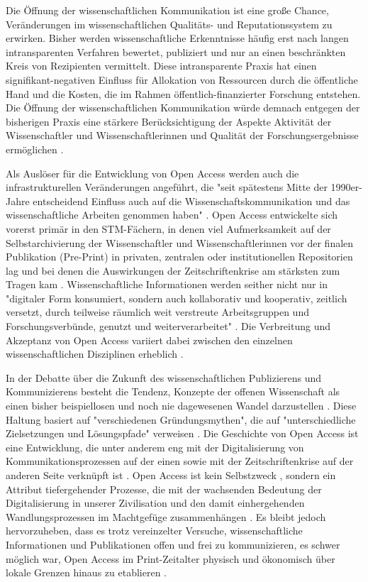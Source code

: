 Die Öffnung der wissenschaftlichen Kommunikation ist eine große Chance, Veränderungen im wissenschaftlichen Qualitäts- und Reputationssystem zu erwirken. Bisher werden wissenschaftliche Erkenntnisse häufig erst nach langen intransparenten Verfahren bewertet, publiziert und nur an einen beschränkten Kreis von Rezipienten vermittelt. Diese intransparente Praxis hat einen signifikant-negativen Einfluss für Allokation von Ressourcen durch die öffentliche Hand und die Kosten, die im Rahmen öffentlich-finanzierter Forschung entstehen. Die Öffnung der wissenschaftlichen Kommunikation würde demnach entgegen der bisherigen Praxis eine stärkere Berücksichtigung der Aspekte Aktivität der Wissenschaftler und Wissenschaftlerinnen und Qualität der Forschungsergebnisse ermöglichen \cite{heise_2012}.

Als Auslöser für die Entwicklung von Open Access werden auch die infrastrukturellen Veränderungen angeführt, die "seit spätestens Mitte der 1990er-Jahre entscheidend Einfluss auch auf die Wissenschaftskommunikation und das wissenschaftliche Arbeiten genommen haben" \cite{schulze_2013_open}. Open Access entwickelte sich vorerst primär in den STM-Fächern, in denen viel Aufmerksamkeit auf der Selbstarchivierung der Wissenschaftler und Wissenschaftlerinnen vor der finalen Publikation (Pre-Print) in privaten, zentralen oder institutionellen Repositorien lag \cite{adema_2013_political} und bei denen die Auswirkungen der Zeitschriftenkrise am stärksten zum Tragen kam \cite{naeder_2010_open}. Wissenschaftliche Informationen werden seither nicht nur in "digitaler Form konsumiert, sondern auch kollaborativ und kooperativ, zeitlich versetzt, durch teilweise räumlich weit verstreute Arbeitsgruppen und Forschungsverbünde, genutzt und weiterverarbeitet" \cite{schulze_2013_open}. Die Verbreitung und Akzeptanz von Open Access variiert dabei zwischen den einzelnen wissenschaftlichen Disziplinen erheblich \cite{cite:21a}.

In der Debatte über die Zukunft des wissenschaftlichen Publizierens und Kommunizierens besteht die Tendenz, Konzepte der offenen Wissenschaft als einen bisher beispiellosen und noch nie dagewesenen Wandel darzustellen \cite{cite:17a} \cite{cite:17b}. Diese Haltung basiert auf "verschiedenen Gründungsmythen", die auf "unterschiedliche Zielsetzungen und Lösungspfade" verweisen \cite[:7]{hofmann2015open}. Die Geschichte von Open Access ist eine Entwicklung, die unter anderem eng mit der Digitalisierung von Kommunikationsprozessen auf der einen sowie mit der Zeitschriftenkrise auf der anderen Seite verknüpft ist \cite[:6]{hofmann2015open} \cite{yiotis_2013_open} \cite{wein_2010_erwerbung}. Open Access ist kein Selbstzweck \cite{cite:17d}, sondern ein Attribut tiefergehender Prozesse, die mit der wachsenden Bedeutung der Digitalisierung in unserer Zivilisation und den damit einhergehenden Wandlungsprozessen im Machtgefüge zusammenhängen \cite{cite:17e}. Es bleibt jedoch hervorzuheben, dass es trotz vereinzelter Versuche, wissenschaftliche Informationen und Publikationen offen und frei zu kommunizieren, es schwer möglich war, Open Access im Print-Zeitalter physisch und ökonomisch über lokale Grenzen hinaus zu etablieren \cite{cite:18a}.

